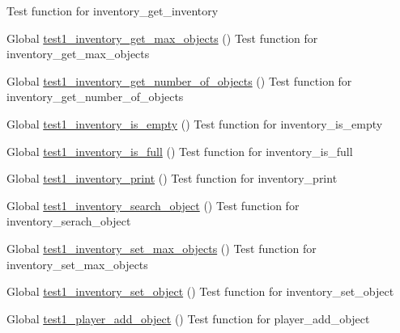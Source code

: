 \begin{DoxyRefList}
Test function for inventory\+\_\+get\+\_\+inventory  
\item[Global \mbox{\hyperlink{inventory__test_8h_a17c5d7d6ecb4161696deca0155e13f4f}{test1\+\_\+inventory\+\_\+get\+\_\+max\+\_\+objects}} ()]\label{test__test000049}%
%
Test function for inventory\+\_\+get\+\_\+max\+\_\+objects  
\item[Global \mbox{\hyperlink{inventory__test_8h_a8ae9f8ddebed8f6dfcda767c1715076d}{test1\+\_\+inventory\+\_\+get\+\_\+number\+\_\+of\+\_\+objects}} ()]\label{test__test000023}%
%
Test function for inventory\+\_\+get\+\_\+number\+\_\+of\+\_\+objects  
\item[Global \mbox{\hyperlink{inventory__test_8h_afe8c9730e30b58535afc0481970ab2b1}{test1\+\_\+inventory\+\_\+is\+\_\+empty}} ()]\label{test__test000035}%
%
Test function for inventory\+\_\+is\+\_\+empty  
\item[Global \mbox{\hyperlink{inventory__test_8h_a7eb3ba387e33c42ff45331c9d9aada34}{test1\+\_\+inventory\+\_\+is\+\_\+full}} ()]\label{test__test000038}%
%
Test function for inventory\+\_\+is\+\_\+full  
\item[Global \mbox{\hyperlink{inventory__test_8h_a7229ceb1916b0da955d23598da89d5ea}{test1\+\_\+inventory\+\_\+print}} ()]\label{test__test000027}%
%
Test function for inventory\+\_\+print  
\item[Global \mbox{\hyperlink{inventory__test_8h_a72641d8b12c0f08ec4aa3590517797e4}{test1\+\_\+inventory\+\_\+search\+\_\+object}} ()]\label{test__test000041}%
%
Test function for inventory\+\_\+serach\+\_\+object  
\item[Global \mbox{\hyperlink{inventory__test_8h_aedc895d6409678b2176d822c105c3796}{test1\+\_\+inventory\+\_\+set\+\_\+max\+\_\+objects}} ()]\label{test__test000046}%
%
Test function for inventory\+\_\+set\+\_\+max\+\_\+objects  
\item[Global \mbox{\hyperlink{inventory__test_8h_a68cdc4960d6ba206a27e71f82486ecd5}{test1\+\_\+inventory\+\_\+set\+\_\+object}} ()]\label{test__test000018}%
%
Test function for inventory\+\_\+set\+\_\+object  
\item[Global \mbox{\hyperlink{player__test_8h_a14a3e4867e2ad3287c8efa99cd36904e}{test1\+\_\+player\+\_\+add\+\_\+object}} ()]\label{test__test000065}%
%
Test function for player\+\_\+add\+\_\+object  

\end{DoxyRefList}
